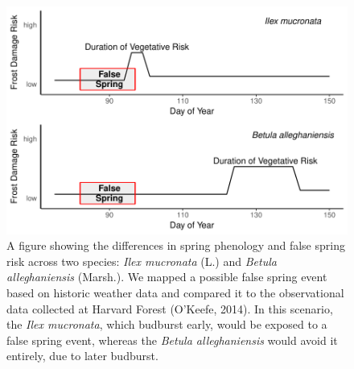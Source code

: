 \documentclass{article}\usepackage[]{graphicx}\usepackage[]{color}
\makeatletter
\def\maxwidth{ %
  \ifdim\Gin@nat@width>\linewidth
    \linewidth
  \else
    \Gin@nat@width
  \fi
}
\makeatother
\begin{document}
\begin{figure}[H]

{\centering \includegraphics[width=\maxwidth]{figure/risk-1} 

}

\caption{A figure showing the differences in spring phenology and false spring risk across two species: \textit{Ilex mucronata} (L.) and \textit{Betula alleghaniensis} (Marsh.). We mapped a possible false spring event based on historic weather data and compared it to the observational data collected at Harvard Forest (O'Keefe, 2014). In this scenario, the \textit{Ilex mucronata}, which budburst early, would be exposed to a false spring event, whereas the \textit{Betula alleghaniensis} would avoid it entirely, due to later budburst.}\label{fig:risk}
\end{figure}
\end{document}

